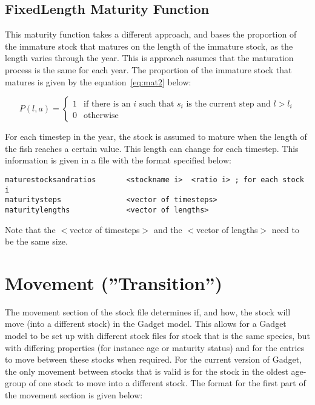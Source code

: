 \documentclass [a4paper, 10pt]{book}
\begin{document}
\subsection{FixedLength Maturity Function}
This maturity function takes a different approach, and bases the proportion of the immature stock that matures on the length of the immature stock, as the length varies through the year.  This is approach assumes that the maturation process is the same for each year.  The proportion of the immature stock that matures is given by the equation~\ref{eq:mat2} below:

\begin{equation}\label{eq:mat2}
P(l, a) =
\begin{cases}
1 & \textrm{if there is an $i$ such that $s_i$ is the current step and $l > l_i$}\\
0 & \textrm{otherwise}
\end{cases}
\end{equation}

For each timestep in the year, the stock is assumed to mature when the length of the fish reaches a certain value.  This length can change for each timestep.  This information is given in a file with the format specified below:

{\small\begin{verbatim}
maturestocksandratios       <stockname i>  <ratio i> ; for each stock i
maturitysteps               <vector of timesteps>
maturitylengths             <vector of lengths>
\end{verbatim}}

Note that the $<$vector of timesteps$>$ and the $<$vector of lengths$>$ need to be the same size.

\section{Movement (''Transition'')}\label{subsec:stockmove}
The movement section of the stock file determines if, and how, the stock will move (into a different stock) in the Gadget model.  This allows for a Gadget model to be set up with different stock files for stock that is the same species, but with differing properties (for instance age or maturity status) and for the entries to move between these stocks when required.  For the current version of Gadget, the only movement between stocks that is valid is for the stock in the oldest age-group of one stock to move into a different stock.  The format for the first part of the movement section is given below:
\end{document}
